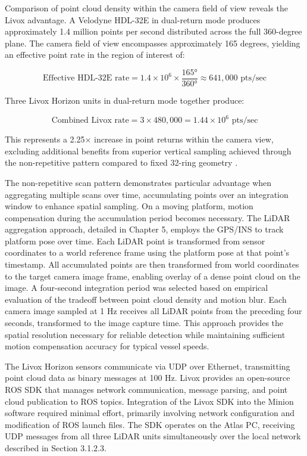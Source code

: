 \documentclass{erauthesis}
\begin{document}
Comparison of point cloud density within the camera field of view reveals the Livox advantage.
A Velodyne HDL-32E in dual-return mode produces approximately 1.4 million points per second distributed across the full 360-degree plane.
The camera field of view encompasses approximately 165 degrees, yielding an effective point rate in the region of interest of:

$$\text{Effective HDL-32E rate} = 1.4 \times 10^6 \times \frac{165°}{360°} \approx 641,000 \text{ pts/sec}$$

Three Livox Horizon units in dual-return mode together produce:

$$\text{Combined Livox rate} = 3 \times 480,000 = 1.44 \times 10^6 \text{ pts/sec}$$

This represents a 2.25× increase in point returns within the camera view, excluding additional benefits from superior vertical sampling achieved through the non-repetitive pattern compared to fixed 32-ring geometry \cite{thompson2023}.

The non-repetitive scan pattern demonstrates particular advantage when aggregating multiple scans over time, accumulating points over an integration window to enhance spatial sampling.
On a moving platform, motion compensation during the accumulation period becomes necessary.
The \ac{LiDAR} aggregation approach, detailed in Chapter 5, employs the \ac{GPS}/\ac{INS} to track platform pose over time.
Each \ac{LiDAR} point is transformed from sensor coordinates to a world reference frame using the platform pose at that point's timestamp.
All accumulated points are then transformed from world coordinates to the target camera image frame, enabling overlay of a dense point cloud on the image.
A four-second integration period was selected based on empirical evaluation of the tradeoff between point cloud density and motion blur.
Each camera image sampled at 1 Hz receives all \ac{LiDAR} points from the preceding four seconds, transformed to the image capture time.
This approach provides the spatial resolution necessary for reliable detection while maintaining sufficient motion compensation accuracy for typical vessel speeds.

The Livox Horizon sensors communicate via UDP over Ethernet, transmitting point cloud data as binary messages at 100 Hz.
Livox provides an open-source \ac{ROS} SDK that manages network communication, message parsing, and point cloud publication to \ac{ROS} topics.
Integration of the Livox SDK into the Minion software required minimal effort, primarily involving network configuration and modification of \ac{ROS} launch files.
The SDK operates on the Atlas PC, receiving UDP messages from all three \ac{LiDAR} units simultaneously over the local network described in Section 3.1.2.3.
\end{document}

